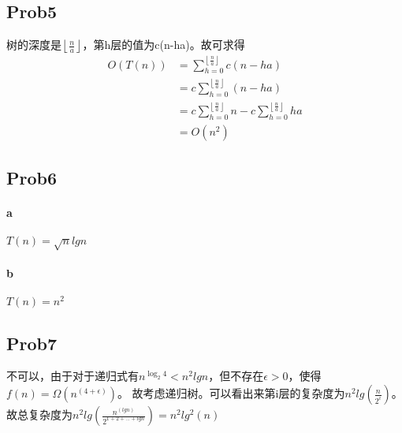 \documentclass{ctexart}
\begin{document}
\subsection{Prob5}
树的深度是$\left \lfloor \frac{n}{a} \right \rfloor$，第h层的值为c(n-ha)。故可求得
\begin{align*}
    O(T(n)) &=\sum_{h=0}^{\left \lfloor \frac{n}{a} \right \rfloor} c(n-ha) \\
            &=c\sum_{h=0}^{\left \lfloor \frac{n}{a} \right \rfloor} (n-ha) \\
            &=c\sum_{h=0}^{\left \lfloor \frac{n}{a} \right \rfloor}n - c\sum_{h=0}^{\left \lfloor \frac{n}{a} \right \rfloor}ha\\
            &=O(n^2)
\end{align*}

\subsection{Prob6}
\paragraph{a} $T(n)=\sqrt{n} lgn$
\paragraph{b} $T(n)=n^2$

\subsection{Prob7}不可以，由于对于递归式有$n^{\log_2 4} < n^2lgn$，但不存在$\epsilon > 0$，使得$f(n)=\Omega(n^(4+\epsilon))$。
故考虑递归树。可以看出来第i层的复杂度为$n^2lg(\frac{n}{2^i})$。
故总复杂度为$n^2lg(\frac{n^(lgn)}{2^{1+2+...+lgn}})=n^2lg^2(n)$
\end{document}
